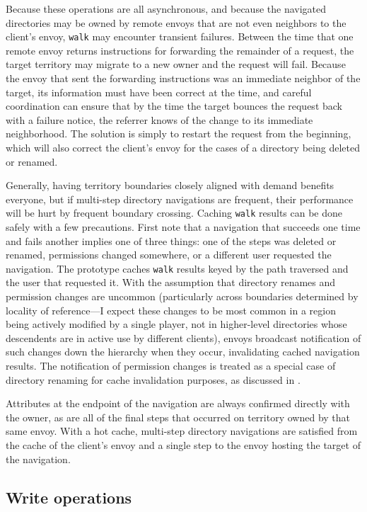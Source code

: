 Because these operations are all asynchronous, and because the navigated directories may be owned by remote envoys that are not even neighbors to the client's envoy, \texttt{walk} may encounter transient failures. Between the time that one remote envoy returns instructions for forwarding the remainder of a request, the target territory may migrate to a new owner and the request will fail. Because the envoy that sent the forwarding instructions was an immediate neighbor of the target, its information must have been correct at the time, and careful coordination can ensure that by the time the target bounces the request back with a failure notice, the referrer knows of the change to its immediate neighborhood. The solution is simply to restart the request from the beginning, which will also correct the client's envoy for the cases of a directory being deleted or renamed.

Generally, having territory boundaries closely aligned with demand benefits everyone, but if multi-step directory navigations are frequent, their performance will be hurt by frequent boundary crossing. Caching \texttt{walk} results can be done safely with a few precautions. First note that a navigation that succeeds one time and fails another implies one of three things: one of the steps was deleted or renamed, permissions changed somewhere, or a different user requested the navigation. The prototype caches \texttt{walk} results keyed by the path traversed and the user that requested it. With the assumption that directory renames and permission changes are uncommon (particularly across boundaries determined by locality of reference---I expect these changes to be most common in a region being actively modified by a single player, not in higher-level directories whose descendents are in active use by different clients), envoys broadcast notification of such changes down the hierarchy when they occur, invalidating cached navigation results. The notification of permission changes is treated as a special case of directory renaming for cache invalidation purposes, as discussed in .

Attributes at the endpoint of the navigation are always confirmed directly with the owner, as are all of the final steps that occurred on territory owned by that same envoy. With a hot cache, multi-step directory navigations are satisfied from the cache of the client's envoy and a single step to the envoy hosting the target of the navigation.

\subsection{Write operations}

